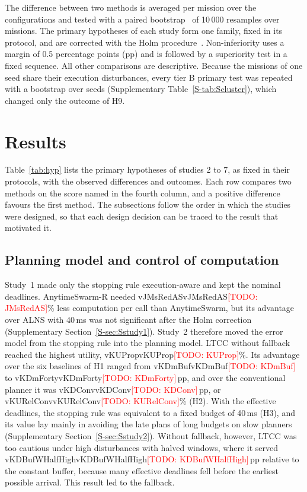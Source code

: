 \documentclass[a4paper,fleqn]{cas-dc}
\newcommand{\todo}[1]{\textcolor{red}{[TODO: #1]}}
\newcommand{\mname}{LTCC}  %
\newcommand{\val}[1]{\ifcsname v#1\endcsname\csname v#1\endcsname\else\todo{#1}\fi}
\newcommand{\uprighttext}{\def\textbf##1{##1}\def\textit##1{##1}}
\newcommand{\inputtable}[1]{\begingroup\uprighttext\endgroup}
\newcounter{prop}
\begin{document}
The difference between two methods is averaged per mission over the configurations and tested with a paired
bootstrap~\cite{efron1993bootstrap} of 10\,000 resamples over missions. The primary hypotheses of each study form one
family, fixed in its protocol, and are corrected with the Holm procedure~\cite{holm1979simple}. Non-inferiority uses a margin of 0.5 percentage points (pp) and is followed by a
superiority test in a fixed sequence. All other comparisons are descriptive. Because the missions of one seed share
their execution disturbances, every tier B primary test was repeated with a bootstrap over seeds (Supplementary
Table~\ref{S-tab:Scluster}), which changed only the outcome of H9.

\section{Results}\label{sec:results}
Table~\ref{tab:hyp} lists the primary hypotheses of studies 2 to 7, as fixed in their protocols, with the observed
differences and outcomes. Each row compares two methods on the score named in the fourth column, and a positive
difference favours the first method. The subsections follow the order in which the studies were designed, so that each
design decision can be traced to the result that motivated it.

\inputtable{tab_hyp}

\subsection{Planning model and control of computation}\label{sec:study1}\label{sec:study2}
Study~1 made only the stopping rule execution-aware and kept the nominal deadlines. AnytimeSwarm-R needed
\val{JMsRedAS}\% less computation per call than AnytimeSwarm, but its advantage over ALNS with 40\,ms was not
significant after the Holm correction (Supplementary Section~\ref{S-sec:Sstudy1}). Study~2 therefore moved the error
model from the stopping rule into the planning model. \mname{} without fallback reached the highest utility,
\val{KUProp}\%. Its advantage over the six baselines of H1 ranged from \val{KDmBuf} to \val{KDmForty}\,pp, and over the
conventional planner it was \val{KDConv}\,pp, or \val{KURelConv}\% (H2). With the effective deadlines, the stopping
rule was equivalent to a fixed budget of 40\,ms (H3), and its value lay mainly in avoiding the late plans of long
budgets on slow planners (Supplementary Section~\ref{S-sec:Sstudy2}). Without fallback, however, \mname{} was too
cautious under high disturbances with halved windows, where it served \val{KDBufWHalfHigh}\,pp relative to the constant
buffer, because many effective deadlines fell before the earliest possible arrival. This result led to the fallback.
\end{document}
